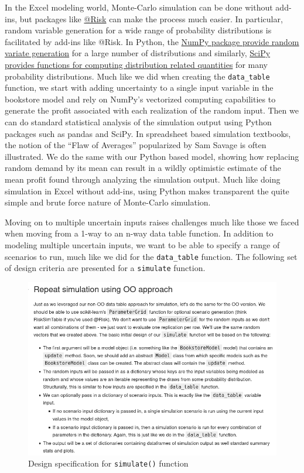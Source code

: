 \documentclass[ited,blindrev]{informs3}              %
\newcommand{\code}[1]{\texttt{#1}}
\begin{document}
In the Excel modeling world, Monte-Carlo simulation can be done without add-ins, but packages like \href{https://lumivero.com/products/at-risk/}{@Risk} can make the process much easier. In particular, random variable generation for a wide range of probability distributions is facilitated by add-ins like @Risk. In Python, the \href{https://numpy.org/doc/stable/reference/random/generator.html}{NumPy package provide random variate generation} for a large number of distributions and similarly, \href{https://docs.scipy.org/doc/scipy/reference/stats.html}{SciPy provides functions for computing distribution related quantities} for many probability distributions. Much like we did when creating the \code{data\_table} function, we start with adding uncertainty to a single input variable in the bookstore model and rely on NumPy's vectorized computing capabilities to generate the profit associated with each realization of the random input. Then we can do standard statistical analysis of the simulation output using Python packages such as pandas and SciPy. In spreadsheet based simulation textbooks, the notion of the ``Flaw of Averages'' popularized by Sam Savage \cite{savageFlawAveragesWhy2012} is often illustrated. We do the same with our Python based model, showing how replacing random demand by its mean can result in a wildly optimistic estimate of the mean profit found through analyzing the simulation output. Much like doing simulation in Excel without add-ins, using Python makes transparent the quite simple and brute force nature of Monte-Carlo simulation.

Moving on to multiple uncertain inputs raises challenges much like those we faced when moving from a 1-way to an n-way data table function. In addition to modeling multiple uncertain inputs, we want to be able to specify a range of scenarios to run, much like we did for the \code{data\_table} function. The following set of design criteria are presented for a \code{simulate} function.

\begin{figure}[!htbp]
	\centering
	\includegraphics[scale=0.5]{images/oo_sim_design_specs.png}
	\caption{Design specification for \code{simulate()} function}
	\label{fig:oo_sim_design_specs}
\end{figure}
\end{document}
